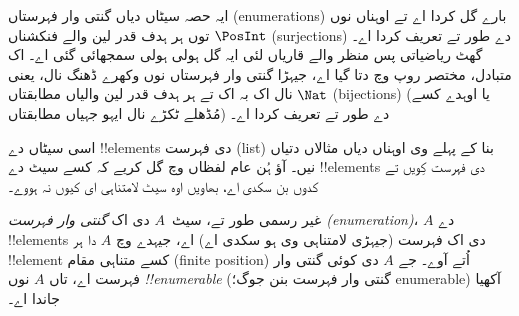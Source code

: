 \documentclass[../../../include/open-logic-section]{subfiles}
\begin{document}


\begin{editorial}
  ایہ حصہ سیٹاں دیاں گنتی وار فہرستاں (enumerations) بارے گل کردا اے
  تے اوہناں نوں $\PosInt$ توں ہر ہدف قدر لین والے فنکشناں
  (surjections) دے طور تے تعریف کردا اے۔ گھٹ ریاضیاتی پس منظر والے
  قاریاں لئی ایہ گل ہولی ہولی سمجھائی گئی اے۔ اک متبادل، مختصر روپ
   وچ دتا گیا اے، جیہڑا گنتی وار فہرستاں نوں وکھرے
  ڈھنگ نال، یعنی $\Nat$ نال اک بہ اک تے ہر ہدف قدر لین والیاں مطابقتاں
  (bijections) (یا اوہدے کسے مُڈھلے ٹکڑے نال ایہو جہیاں مطابقتاں) دے
  طور تے تعریف کردا اے۔
\end{editorial}

\begin{explain}
اسی سیٹاں دے !!{element}s دی فہرست (list) بنا کے پہلے وی اوہناں دیاں مثالاں
دتیاں نیں۔ آؤ ہُن عام لفظاں وچ گل کریے کہ کسے سیٹ دے !!{element}s دی
فہرست کِویں تے کدوں بن سکدی اے، بھاویں اوہ سیٹ لامتناہی ای کیوں نہ ہووے۔
\end{explain}

\begin{defn}
غیر رسمی طور تے، سیٹ~$A$ دی اک \emph{گنتی وار فہرست (enumeration)}، $A$ دے
!!{element}s دی اک فہرست (جیہڑی لامتناہی وی ہو سکدی اے) اے، جیہدے
وچ $A$ دا ہر !!{element} کسے متناہی مقام (finite position) اُتے آوے۔
جے $A$ دی کوئی گنتی وار فہرست اے، تاں $A$ نوں
\emph{!!{enumerable}} (گنتی وار فہرست بنن جوگ؛ enumerable) آکھیا جاندا اے۔
\end{defn}
\end{document}
